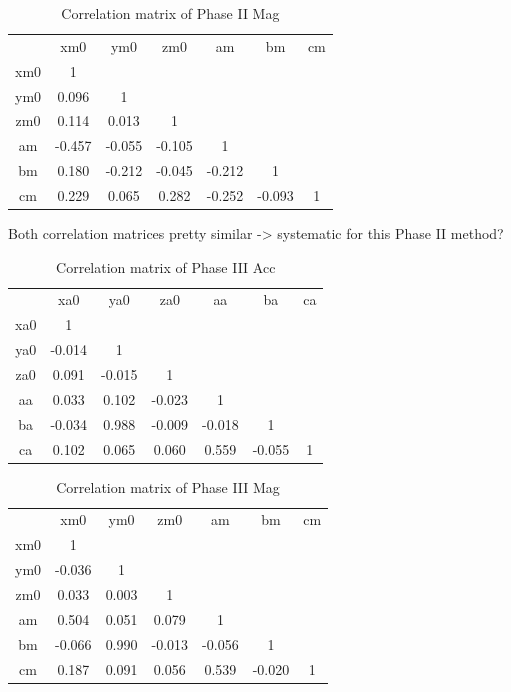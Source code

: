\begin{table}
    \centering
    \begin{tabular}{c|c|c|c|c|c|c}
             &   xm0  & ym0    &   zm0  &   am   &   bm   & cm \\
         xm0 &  1     &        &        &        &        &    \\
         ym0 &  0.096 &  1     &        &        &        &    \\
         zm0 &  0.114 &  0.013 &  1     &        &        &    \\
         am  & -0.457 & -0.055 & -0.105 &  1     &        &    \\
         bm  &  0.180 & -0.212 & -0.045 & -0.212 &  1     &    \\
         cm  &  0.229 &  0.065 &  0.282 & -0.252 & -0.093 & 1  \\
    \end{tabular}
    \caption{Correlation matrix of Phase II Mag}
    \label{tab:my_label}
\end{table}

Both correlation matrices pretty similar -> systematic for this Phase II method?

\begin{table}
    \centering
    \begin{tabular}{c|c|c|c|c|c|c}
         & xa0 & ya0 & za0 & aa & ba & ca \\
         xa0 & 1 & & & & & \\
         ya0 & -0.014  & 1 & & & & \\
         za0 & 0.091 & -0.015 & 1 & & & \\
         aa &  0.033 & 0.102 & -0.023 & 1 & & \\
         ba & -0.034 &  0.988 & -0.009 & -0.018 & 1 & \\
         ca & 0.102 & 0.065 & 0.060 & 0.559 & -0.055 & 1 \\
    \end{tabular}
    \caption{Correlation matrix of Phase III Acc}
    \label{tab:my_label}
\end{table}

\begin{table}
    \centering
    \begin{tabular}{c|c|c|c|c|c|c}
         & xm0 & ym0 & zm0 & am & bm & cm \\
         xm0 & 1 & & & & & \\
         ym0 & -0.036 & 1 & & & & \\
         zm0 & 0.033 & 0.003 & 1 & & & \\
         am & 0.504 & 0.051 & 0.079 & 1 & & \\
         bm & -0.066 & 0.990 & -0.013 & -0.056 & 1 & \\
         cm & 0.187 & 0.091 & 0.056 & 0.539 & -0.020 & 1 \\
    \end{tabular}
    \caption{Correlation matrix of Phase III Mag}
    \label{tab:my_label}
\end{table}

